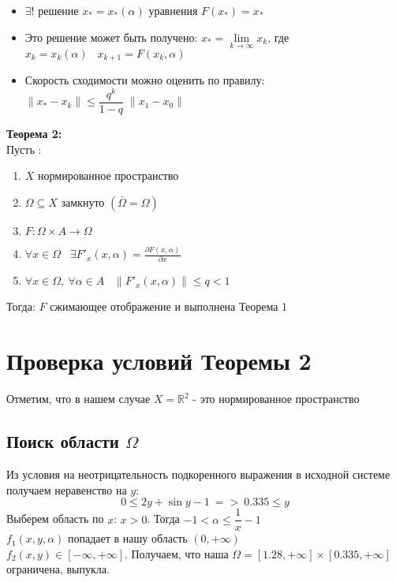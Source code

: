 \documentclass[a4paper,12pt]{article}
\begin{document}
\begin{itemize}
\item $\exists !$ решение $x_{*}=x_{*}(\alpha)$ уравнения $F(x_{*})=x_{*}$
\item Это решение может быть получено: $x_{*} = \lim\limits_{k\to\infty} x_k$, где $x_k =x_k(\alpha)\;\;\; x_{k+1}=F(x_k, \alpha)$
\item Скорость сходимости можно оценить по правилу:
$\|x_* - x_k\| \leq \dfrac{q^k}{1-q}\;\|x_1 -  x_0\|$
\end{itemize}

{\bf Теорема 2:} \\
Пусть : 
\begin{enumerate}
\item $X$ нормированное пространство 
\item $\Omega\subseteq X $ замкнуто $(\overline{\Omega}=\Omega)$
\item $F:\Omega\times A \to \Omega$
\item $\forall x \in \Omega \;\;\;\exists F'_x (x, \alpha)=\frac{\partial F(x, \alpha)}{\partial x}$
\item $\forall x \in \Omega, \ \forall \alpha \in A \;\;\; \|F'_x(x,\alpha)\| \leq q<1$
\end{enumerate}
Тогда: $F$ сжимающее отображение и выполнена \textsf{Теорема 1}
\smallskip
\section{Проверка условий Теоремы 2}
Отметим, что в нашем случае $X = \mathbb{R}^2$ - это нормированное пространство
\subsection{Поиск области \protect$\Omega$}
Из условия на неотрицательность подкоренного выражения в исходной системе получаем неравенство на $y$:
\[ 0 \le 2y+\sin{y}-1 \ => \ 0.335 \le y \]
Выберем область по $x$: $x>0$. Тогда $-1 <\alpha \leq \dfrac{1}{x}-1$\\
$f_1(x,y,\alpha)$ попадает в нашу область $(0, +\infty)$\\
$f_2(x,y) \in [-\infty,+\infty]$.
Получаем, что наша $\Omega=[1.28,+\infty]\times[0.335,+\infty]$ ограничена, выпукла.
\end{document}
